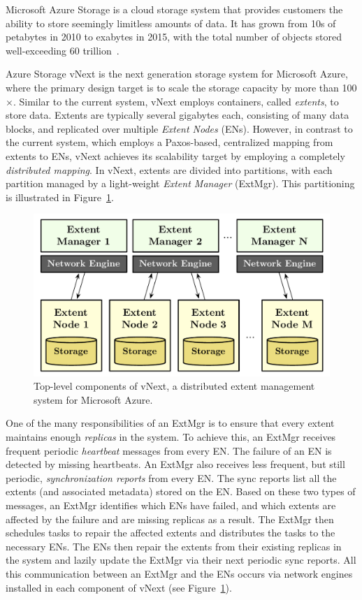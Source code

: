 Microsoft Azure Storage is a cloud storage system that provides customers the ability to store seemingly limitless amounts of data. It has grown from 10s of petabytes in 2010 to exabytes in 2015, with the total number of objects stored well-exceeding 60 trillion~\cite{greenberg2015keynote}.

Azure Storage vNext is the next generation storage system for Microsoft Azure, where the primary design target is to scale the storage capacity by more than 100$\times$. Similar to the current system, vNext employs containers, called {\em extents}, to store data. Extents are typically several gigabytes each, consisting of many data blocks, and replicated over multiple {\em Extent Nodes} (ENs). However, in contrast to the current system, which employs a Paxos-based, centralized mapping from extents to ENs, vNext achieves its scalability target by employing a completely \emph{distributed mapping}. In vNext, extents are divided into partitions, with each partition managed by a light-weight {\em Extent Manager} (ExtMgr). This partitioning is illustrated in Figure~\ref{fig:vnext}.

\begin{figure}[t]
\centering
\includegraphics[width=\linewidth]{img/azurestore}
\caption{Top-level components of vNext, a distributed extent management system for Microsoft Azure.}
\label{fig:vnext}
\end{figure}

One of the many responsibilities of an ExtMgr is to ensure that every extent maintains enough \emph{replicas} in the system. To achieve this, an ExtMgr receives frequent periodic \emph{heartbeat} messages from every EN. The failure of an EN is detected by missing heartbeats. An ExtMgr also receives less frequent, but still periodic, {\em synchronization reports} from every EN. The sync reports list all the extents (and associated metadata) stored on the EN. Based on these two types of messages, an ExtMgr identifies which ENs have failed, and which extents are affected by the failure and are missing replicas as a result. The ExtMgr then schedules tasks to repair the affected extents and distributes the tasks to the necessary ENs. The ENs then repair the extents from their existing replicas in the system and lazily update the ExtMgr via their next periodic sync reports. All this communication between an ExtMgr and the ENs occurs via network engines installed in each component of vNext (see Figure~\ref{fig:vnext}).

